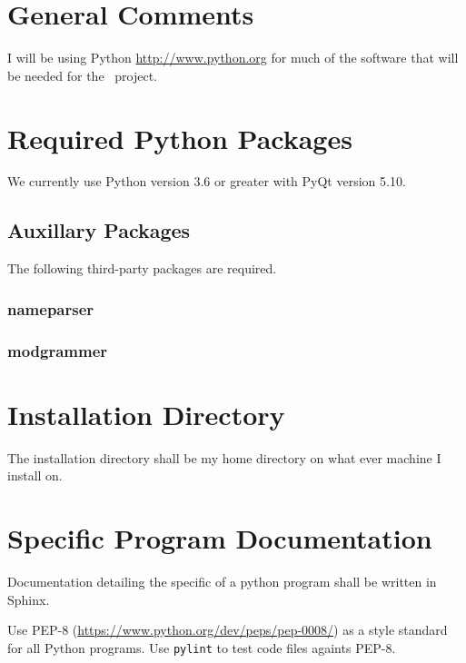 \section{General Comments}

I will be using Python \url{http://www.python.org} for much of the software
that will be needed for the \ProjectTitle\ project.

\section{Required Python Packages}

We currently use Python version 3.6 or greater with PyQt version 5.10.

\subsection{Auxillary Packages}
The following third-party packages are required.

\subsubsection{nameparser}

\subsubsection{modgrammer}

\section{Installation Directory}

The installation directory shall be my home directory on what ever machine
I install on.

\section{Specific Program Documentation}

Documentation detailing the specific of a python program shall be
written in Sphinx.

Use PEP-8  (\url{https://www.python.org/dev/peps/pep-0008/}) as a
style standard for all Python programs. Use \texttt{pylint} to test
code files againts PEP-8. 


